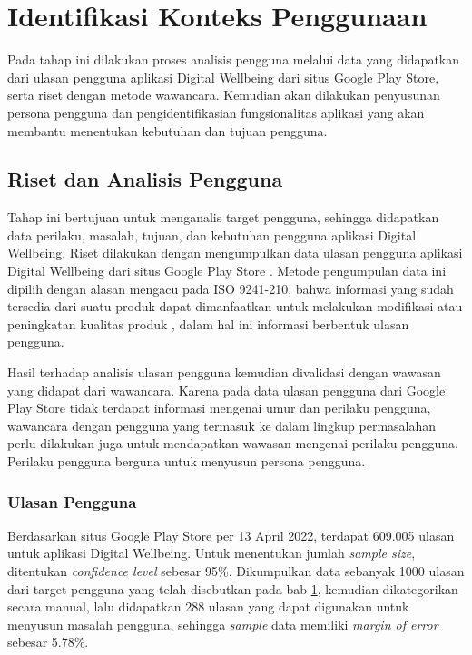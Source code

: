 

\section{Identifikasi Konteks Penggunaan}
\label{sec:identifikasi_konteks_penggunaan}

Pada tahap ini dilakukan proses analisis pengguna melalui data yang didapatkan dari ulasan pengguna aplikasi Digital Wellbeing dari situs Google Play Store, serta riset dengan metode wawancara. Kemudian akan dilakukan penyusunan persona pengguna dan pengidentifikasian fungsionalitas aplikasi yang akan membantu menentukan kebutuhan dan tujuan pengguna.

\subsection{Riset dan Analisis Pengguna}
\label{subsec:riset_analisis}

Tahap ini bertujuan untuk menganalis target pengguna, sehingga didapatkan data perilaku, masalah, tujuan, dan kebutuhan pengguna aplikasi Digital Wellbeing. Riset dilakukan dengan mengumpulkan data ulasan pengguna aplikasi Digital Wellbeing dari situs Google Play Store \textcite{dwplaystorereviews}. Metode pengumpulan data ini dipilih dengan alasan mengacu pada ISO 9241-210, bahwa informasi yang sudah tersedia dari suatu produk dapat dimanfaatkan untuk melakukan modifikasi atau peningkatan kualitas produk \parencite{iso9241-210:2010}, dalam hal ini informasi berbentuk ulasan pengguna.

Hasil terhadap analisis ulasan pengguna kemudian divalidasi dengan wawasan yang didapat dari wawancara. Karena pada data ulasan pengguna dari Google Play Store tidak terdapat informasi mengenai umur dan perilaku pengguna, wawancara dengan pengguna yang termasuk ke dalam lingkup permasalahan perlu dilakukan juga untuk mendapatkan wawasan mengenai perilaku pengguna. Perilaku pengguna berguna untuk menyusun persona pengguna.

\subsubsection{Ulasan Pengguna}
\label{subsubsec:ulasan_pengguna}

Berdasarkan situs Google Play Store per 13 April 2022, terdapat 609.005 ulasan untuk aplikasi Digital Wellbeing. Untuk menentukan jumlah \textit{sample size}, ditentukan \textit{confidence level} sebesar 95\%. Dikumpulkan data sebanyak 1000 ulasan dari target pengguna yang telah disebutkan pada bab \ref{sec:identifikasi_konteks_penggunaan},  kemudian dikategorikan secara manual, lalu didapatkan 288 ulasan yang dapat digunakan untuk menyusun masalah pengguna, sehingga \textit{sample} data memiliki \textit{margin of error} sebesar 5.78\%.

